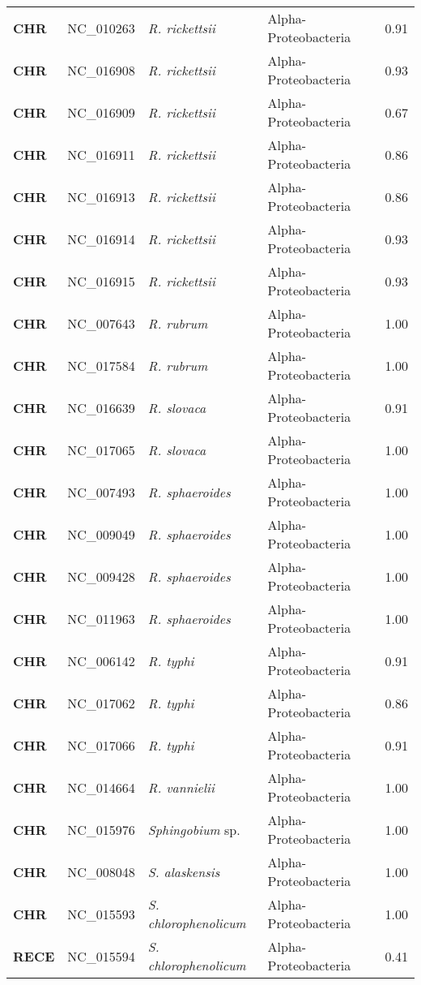 \begin{adjustwidth}{-3cm}{2cm}
{\begin{supertabular}{>{\bfseries}l|p{0.1\textwidth}p{0.14\textwidth}l|l}
CHR & NC\_010263 & \textit{R. rickettsii} & Alpha-Proteobacteria & 0.91\\
CHR & NC\_016908 & \textit{R. rickettsii} & Alpha-Proteobacteria & 0.93\\
CHR & NC\_016909 & \textit{R. rickettsii} & Alpha-Proteobacteria & 0.67\\
CHR & NC\_016911 & \textit{R. rickettsii} & Alpha-Proteobacteria & 0.86\\
CHR & NC\_016913 & \textit{R. rickettsii} & Alpha-Proteobacteria & 0.86\\
CHR & NC\_016914 & \textit{R. rickettsii} & Alpha-Proteobacteria & 0.93\\
CHR & NC\_016915 & \textit{R. rickettsii} & Alpha-Proteobacteria & 0.93\\
CHR & NC\_007643 & \textit{R. rubrum} & Alpha-Proteobacteria & 1.00\\
CHR & NC\_017584 & \textit{R. rubrum} & Alpha-Proteobacteria & 1.00\\
CHR & NC\_016639 & \textit{R. slovaca} & Alpha-Proteobacteria & 0.91\\
CHR & NC\_017065 & \textit{R. slovaca} & Alpha-Proteobacteria & 1.00\\
CHR & NC\_007493 & \textit{R. sphaeroides} & Alpha-Proteobacteria & 1.00\\
CHR & NC\_009049 & \textit{R. sphaeroides} & Alpha-Proteobacteria & 1.00\\
CHR & NC\_009428 & \textit{R. sphaeroides} & Alpha-Proteobacteria & 1.00\\
CHR & NC\_011963 & \textit{R. sphaeroides} & Alpha-Proteobacteria & 1.00\\
CHR & NC\_006142 & \textit{R. typhi} & Alpha-Proteobacteria & 0.91\\
CHR & NC\_017062 & \textit{R. typhi} & Alpha-Proteobacteria & 0.86\\
CHR & NC\_017066 & \textit{R. typhi} & Alpha-Proteobacteria & 0.91\\
CHR & NC\_014664 & \textit{R. vannielii} & Alpha-Proteobacteria & 1.00\\
CHR & NC\_015976 & \textit{Sphingobium} sp. & Alpha-Proteobacteria & 1.00\\
CHR & NC\_008048 & \textit{S. alaskensis} & Alpha-Proteobacteria & 1.00\\
CHR & NC\_015593 & \textit{S. chlorophenolicum} & Alpha-Proteobacteria & 1.00\\
RECE & NC\_015594 & \textit{S. chlorophenolicum} & Alpha-Proteobacteria & 0.41\\

\end{supertabular}}
\end{adjustwidth}
